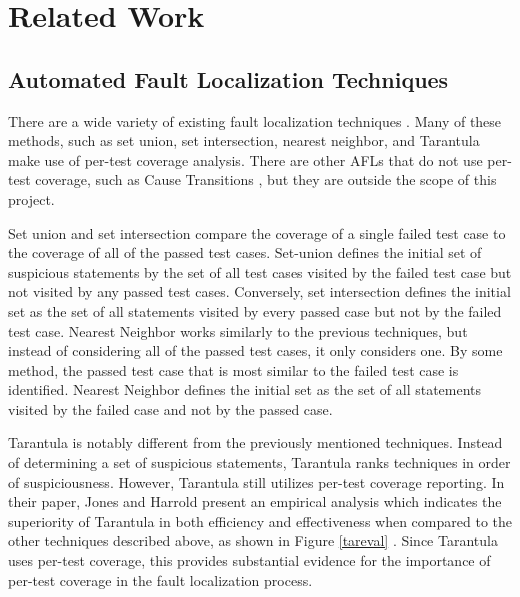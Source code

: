 %
%
\chapter{Related Work}\label{ch:relatedwork}

\section{Automated Fault Localization Techniques}\label{sec:afl}

There are a wide variety of existing fault localization techniques
\cite{harrold}. Many of these methods, such as set union, set intersection, 
nearest neighbor, and Tarantula make use of per-test coverage
analysis.  There are other AFLs that do not use per-test coverage, such
as Cause Transitions \cite{cause}, but they are outside the scope of this project.  

Set union and set intersection compare the coverage of a single failed
test case to the coverage of all of the passed test cases.  Set-union
defines the initial set of suspicious statements by the set of all test
cases visited by the failed test case but not visited by any passed test
cases.  Conversely, set intersection defines the initial set as the set
of all statements visited by every passed case but not by the failed
test case.  Nearest Neighbor works similarly to the previous techniques,
but instead of considering all of the passed test cases, it only
considers one.  By some method, the passed test case that is most
similar to the failed test case is identified.  Nearest Neighbor defines
the initial set as the set of all statements visited by the failed case
and not by the passed case.

Tarantula is notably different from the previously mentioned techniques.
Instead of determining a set of suspicious statements, Tarantula ranks
techniques in order of suspiciousness.  However, Tarantula still
utilizes per-test coverage reporting.  In their paper, Jones and Harrold
present an empirical analysis which indicates the superiority of
Tarantula in both efficiency and effectiveness when compared to the
other techniques described above, as shown in Figure \ref{tareval} \cite{harrold}.  Since Tarantula
uses per-test coverage, this provides substantial evidence for the
importance of per-test coverage in the fault localization process.

